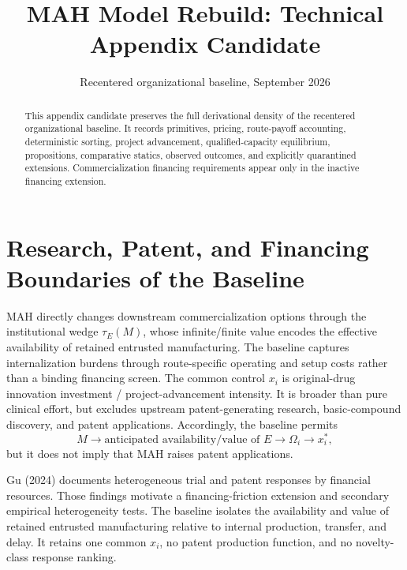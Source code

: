 \documentclass[11pt]{article}
\title{MAH Model Rebuild: Technical Appendix Candidate}
\author{}
\date{Recentered organizational baseline, September 2026}
\begin{document}
\maketitle

\begin{abstract}
This appendix candidate preserves the full derivational density of the
recentered organizational baseline. It records primitives, pricing,
route-payoff accounting, deterministic sorting, project advancement,
qualified-capacity equilibrium, propositions, comparative statics, observed
outcomes, and explicitly quarantined extensions. Commercialization financing
requirements appear only in the inactive financing extension.
\end{abstract}

\tableofcontents












\section{Research, Patent, and Financing Boundaries of the Baseline}
\label{sec:p16a-research-development-boundary}

MAH directly changes downstream commercialization options through the
institutional wedge \(\tau_E(M)\), whose infinite/finite value encodes the
effective availability of retained entrusted manufacturing. The baseline
captures internalization burdens through route-specific operating and setup
costs rather than a binding financing screen. The common control \(x_i\) is
original-drug innovation investment / project-advancement intensity. It is
broader than pure clinical effort, but excludes upstream patent-generating
research, basic-compound discovery, and patent applications. Accordingly, the
baseline permits
\[
  M
  \longrightarrow
  \text{anticipated availability/value of }E
  \longrightarrow
  \Omega_i
  \longrightarrow
  x_i^*,
\]
but it does not imply that MAH raises patent applications.

Gu (2024) documents heterogeneous trial and patent responses by financial
resources. Those findings motivate a financing-friction extension and
secondary empirical heterogeneity tests. The baseline isolates the
availability and value of retained entrusted manufacturing relative to
internal production, transfer, and delay. It retains one common \(x_i\), no
patent production function, and no novelty-class response ranking.



\end{document}
